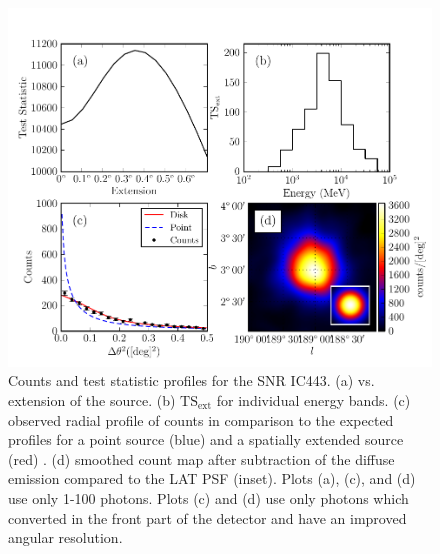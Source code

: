 \documentclass[12pt,preprint]{aastex}
\newcommand{\gev}{\text{GeV}\xspace}
\newcommand{\tsext}{{\ensuremath{\text{TS}_{\text{ext}}}}\xspace}
\newcommand{\ts}{\text{TS}\xspace}
\begin{document}
\clearpage
\begin{figure}
  \begin{center}
    \includegraphics{ic443_plots/four_plots_ic443.pdf}
    \caption{
    Counts and test statistic profiles for the SNR IC443. (a) \ts
    vs. extension of the source. (b) \tsext for individual energy bands. (c)
    observed radial profile of counts in comparison to the expected profiles
    for a point source (blue) and a spatially extended source (red) . (d)
    smoothed count map after subtraction of the diffuse emission compared
    to the LAT PSF (inset).  Plots (a), (c), and (d) use only 1-100 \gev photons. 
    Plots (c) and (d)
    use only photons which converted in the front
    part of the detector and have an improved angular resolution.
    }
    \label{four_plots_ic443}
  \end{center}
\end{figure}
\end{document}

